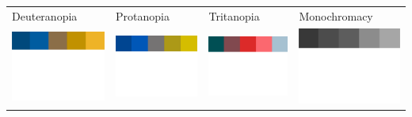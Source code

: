 \documentclass[aspectratio=169]{beamer}
\begin{document}
\begin{frame}[c]
\pause
\vspace{4mm}
\small
\begin{tabular}{@{}p{}@{}p{}@{}p{}@{}p{}@{}}
Deuteranopia & Protanopia & Tritanopia & Monochromacy\\
\includegraphics[width=.2\textwidth]{palettes/qualitative-palette-deuteranopia.png} & \includegraphics[width=.2\textwidth]{palettes/qualitative-palette-protanopia.png} & \includegraphics[width=.2\textwidth]{palettes/qualitative-palette-tritanopia.png} & \includegraphics[width=.2\textwidth]{palettes/qualitative-palette-monochrome.png}\\
\end{tabular}


\end{frame}
\end{document}
